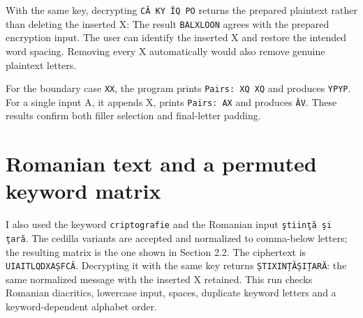 \documentclass{tum_report}
\newcommand{\consolepart}[1]{{\setstretch{1}}}
\begin{document}
With the same key, decrypting \texttt{CĂ KY ÎQ PO} returns the prepared
plaintext rather than deleting the inserted X:
\consolepart{balloon_decrypt}
The result \texttt{BALXLOON} agrees with the prepared encryption input.
The user can identify the inserted X and restore the intended word spacing.
Removing every X automatically would also remove genuine plaintext letters.

For the boundary case \texttt{XX}, the program prints
\texttt{Pairs: XQ XQ} and produces \texttt{YPYP}. For a single input A,
it appends X, prints \texttt{Pairs: AX} and produces \texttt{ÂV}.
These results confirm both filler selection and final-letter padding.

\clearpage
\section{Romanian text and a permuted keyword matrix}
I also used the keyword \texttt{criptografie} and the Romanian input
\texttt{ştiinţă şi ţară}. The cedilla variants are accepted and normalized
to comma-below letters; the resulting matrix is the one shown in Section 2.2.
\consolepart{romanian_encrypt}
The ciphertext is \texttt{UIAITLQDXAȘFCÂ}. Decrypting it with the same key
returns \texttt{ȘTIXINȚĂȘIȚARĂ}: the same normalized message with the
inserted X retained. This run checks Romanian diacritics, lowercase input,
spaces, duplicate keyword letters and a keyword-dependent alphabet order.
\end{document}
